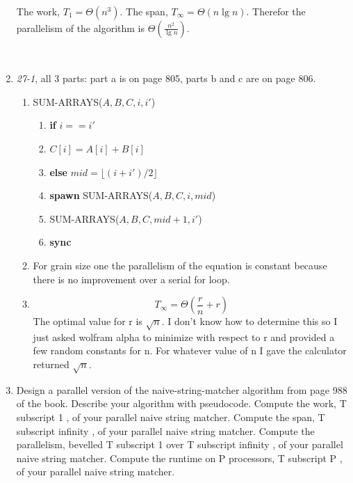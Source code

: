 \documentclass[]{memoir}
\begin{document}
\begin{enumerate}
\paragraph{}
\begin{Large}
The work, $T_{1}=\Theta{}(n^{3})$. The span, $T_{\infty} = \Theta{}(n\lg{n})$. Therefor the parallelism of the algorithm is $\Theta{}(\frac{n^{2}}{\lg{n}})$.
\end{Large}
\\\item \textit{27-1}, all 3 parts: part a is on page 805, parts b and c are on page 806.
\begin{enumerate}
\item 
SUM-ARRAYS($A,B,C,i,i'$)
\begin{enumerate}[label=\arabic*\hspace{2mm}]
	\item \textbf{if} $i == i'$
	\item \hspace{1cm} $C[i] = A[i] + B[i]$
	\item \textbf{else} $mid = \lfloor (i+i')/2 \rfloor$
	\item \hspace{1cm} \textbf{spawn} SUM-ARRAYS($A,B,C,i,mid$)
	\item \hspace{1cm} SUM-ARRAYS($A,B,C,mid+1,i'$)
	\item \hspace{1cm} \textbf{sync}
\end{enumerate}
\item
For grain size one the parallelism of the equation is constant because there is no improvement over a serial for loop.
\item
$$T_{\infty} = \Theta{}(\frac{r}{n}+r)$$
The optimal value for r is $\sqrt{n}$. I don't know how to determine this so I just asked wolfram alpha to minimize with respect to r and provided a few random constants for n. For whatever value of n I gave the calculator returned $\sqrt{n}$.
\end{enumerate}
\item Design a parallel version of the naive-string-matcher algorithm from page 988 of the book.  Describe your algorithm with pseudocode.
        Compute the work, T subscript 1 , of your parallel naive string matcher.
        Compute the span, T subscript infinity , of your parallel naive string matcher.
        Compute the parallelism, bevelled T subscript 1 over T subscript infinity , of your parallel naive string matcher.
        Compute the runtime on P processors, T subscript P , of your parallel naive string matcher.


\end{enumerate}
\end{document}
